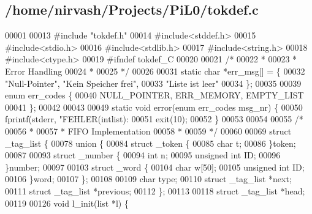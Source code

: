 \subsection{/home/nirvash/\-Projects/\-Pi\-L0/tokdef.c}

\begin{DoxyCode}
00001 
00013 \textcolor{preprocessor}{#include "tokdef.h"}
00014 \textcolor{preprocessor}{#include<stddef.h>}
00015 \textcolor{preprocessor}{#include<stdio.h>}
00016 \textcolor{preprocessor}{#include<stdlib.h>}
00017 \textcolor{preprocessor}{#include<string.h>}
00018 \textcolor{preprocessor}{#include<ctype.h>}
00019 \textcolor{preprocessor}{#ifndef tokdef\_C}
00020 \textcolor{preprocessor}{}
00021 \textcolor{comment}{/*}
00022 \textcolor{comment}{ * }
00023 \textcolor{comment}{ * Error Handling}
00024 \textcolor{comment}{ * }
00025 \textcolor{comment}{*/}
00026 
00031 \textcolor{keyword}{static} \textcolor{keywordtype}{char} *err_msg[] = \{
00032     \textcolor{stringliteral}{"Null-Pointer"}, \textcolor{stringliteral}{"Kein Speicher frei"},
00033     \textcolor{stringliteral}{"Liste ist leer"}
00034   \}; 
00035   
00039 \textcolor{keyword}{enum} err_codes \{
00040     NULL_POINTER, ERR_MEMORY, EMPTY_LIST
00041   \};
00042   
00043 
00049 \textcolor{keyword}{static} \textcolor{keywordtype}{void} error(\textcolor{keyword}{enum} err_codes msg\_nr) \{
00050   fprintf(stderr, \textcolor{stringliteral}{"FEHLER(intlist): %
00051   exit(10);
00052 \}
00053 
00054 
00055 \textcolor{comment}{/*}
00056 \textcolor{comment}{ * }
00057 \textcolor{comment}{ * FIFO Implementation}
00058 \textcolor{comment}{ * }
00059 \textcolor{comment}{ */}
00060 
00069 \textcolor{keyword}{struct }_tag_list \{
00078   \textcolor{keyword}{union }\{
00084     \textcolor{keyword}{struct }\_token \{
00085       \textcolor{keywordtype}{char} t; 
00086     \}token;
00087     
00093     \textcolor{keyword}{struct }\_number \{
00094       \textcolor{keywordtype}{int} n; 
00095       \textcolor{keywordtype}{unsigned} \textcolor{keywordtype}{int} ID; 
00096     \}number;
00097     
00103     \textcolor{keyword}{struct }\_word \{
00104       \textcolor{keywordtype}{char} w[50]; 
00105       \textcolor{keywordtype}{unsigned} \textcolor{keywordtype}{int} ID; 
00106     \}word;
00107   \};
00108 
00109   \textcolor{keywordtype}{char} type; 
00110   \textcolor{keyword}{struct }_tag_list *next; 
00111   \textcolor{keyword}{struct }_tag_list *previous; 
00112 \};
00113 
00118 \textcolor{keyword}{struct }_tag_list *head;
00119 
00126 \textcolor{keywordtype}{void} l_init(list *l) \{
}
\end{DoxyCode}
